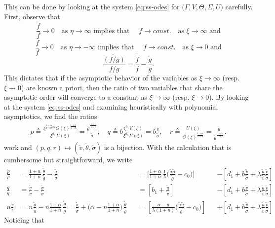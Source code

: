 \documentclass[a4paper,11pt]{article}
\def\tv{{\tilde{v}}}
\def\tth{{\tilde{\theta}}}
\def\ts{{\tilde{\sigma}}}
\def\tu{{\tilde{u}}}
\def\dtv{{\dot{\tilde{v}}}}
\def\dtth{{\dot{\tilde{\theta}}}}
\def\dts{{\dot{\tilde{\sigma}}}}
\def\dtu{{\dot{\tilde{u}}}}
\def\dpp{\dot{p}}
\def\dqq{\dot{q}}
\def\drr{\dot{r}}
\begin{document}
This can be done by looking at the system \eqref{eq:ss-odes} for $\big(\Gamma,V,\Theta,\Sigma,U)$ carefully. First, observe that
$$ \frac{\dot{f}}{f} \rightarrow 0 \quad \text{as $\eta \rightarrow \infty$ implies that } \quad f \rightarrow const. \quad \text{as $\xi \rightarrow \infty$ and}$$
$$ \frac{\dot{f}}{f} \rightarrow 0 \quad \text{as $\eta \rightarrow -\infty$ implies that } \quad f \rightarrow const. \quad \text{as $\xi \rightarrow 0$ and}$$
$$ \frac{\dot{(f/g)}}{f/g} = \frac{\dot{f}}{f} - \frac{\dot{g}}{g}. $$
This dictates that if the asymptotic behavior of the variables as $\xi \rightarrow \infty$ (resp. $\xi \rightarrow 0$) are known a priori, then the ratio of two variables that share the asymptotic order will converge to a constant as $\xi \rightarrow \infty$ (resp. $\xi \rightarrow 0$). By looking at the system \eqref{eq:ss-odes} and examining heuristically with polynomial asymptotics, we find the ratios
\begin{equation}\label{eq:pqrdef}
 \begin{aligned}
  p \triangleq \frac{ \xi^{\frac{1+\alpha}{1+n}c_1} \Theta(\xi)^{\frac{1+\alpha}{1+n}}}{\xi^{d_1} \Sigma(\xi)}=\frac{\tth^{\,\frac{1+\alpha}{1+n}}}{\ts}, \quad q \triangleq b\frac{ \xi^{b_1} V(\xi) }{ \xi^{d_1} \Sigma(\xi)}=b \frac{\tv}{\ts},  \quad r \triangleq \frac{ U(\xi) }{ \Theta(\xi)^{\frac{1+\alpha}{1+n}} } = \frac{u}{\tth^{\,\frac{1+\alpha}{1+n}}}.
 \end{aligned}
\end{equation}
 work and $(p,q,r) \leftrightarrow (\tv, \tth,\ts)$ is a bijection.
With the calculation that is cumbersome but straightforward, we write
\begin{align*}
 \frac{\dpp}{p}&=\frac{1+\alpha}{1+n}\,\frac{\dtth}{\tth} - \frac{\dts}{\ts}& &=\Big[\frac{1+\alpha}{1+n}\,\frac{1}{\lambda }\Big(\frac{\ts\tu}{\tth}-c_0\Big)\Big] & &-\left[d_1 + b\frac{\tv}{\ts} + \lambda\frac{\tu}{\tv}\frac{\tv}{\ts}\right]\\
 \frac{\dqq}{q}&=\frac{\dtv}{\tv} - \frac{\dts}{\ts}& &=\left[b_1 +\frac{\tu}{\tv}\right] & &-\left[d_1 + b\frac{\tv}{\ts} + \lambda\frac{\tu}{\tv}\frac{\tv}{\ts}\right]\\
 n\frac{\drr}{r}&=n\frac{\dtu}{\tu} -n\frac{1+\alpha}{1+n}\,\frac{\dtth}{\tth}= \frac{\dts}{\ts} + \Big(\alpha-n\frac{1+\alpha}{1+n}\Big)\,\frac{\dtth}{\tth} & &=\left[\frac{\alpha-n}{\lambda(1+n)}\Big(\frac{\ts\tu}{\tth}-c_0\Big)\right]& &+\left[d_1 + b\frac{\tv}{\ts} + \lambda\frac{\tu}{\tv}\frac{\tv}{\ts}\right]
\end{align*}
Noticing that
\end{document}
